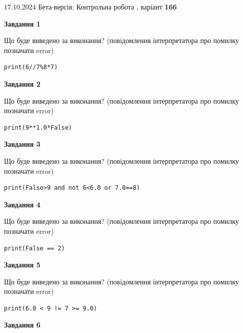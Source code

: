 \documentclass[12pt, ukrainian]{article}
\begin{document}
{\Large{17.10.2024 Бета-версія: Контрольна робота , варіант  \No \textbf { 166 }\par}}
{
\begin {large}
{\begin {center}\textbf{Завдання 1}\end {center}}

Що буде виведено за виконання? (повідомлення інтерпретатора про помилку позначати error)\par
\begin{verbatim}
print(6//7%8*7)
\end{verbatim}

{\begin {center}\textbf{Завдання 2}\end {center}}

Що буде виведено за виконання? (повідомлення інтерпретатора про помилку позначати error)\par
\begin{verbatim}
print(9**1.0*False)
\end{verbatim}

{\begin {center}\textbf{Завдання 3}\end {center}}

Що буде виведено за виконання? (повідомлення інтерпретатора про помилку позначати error)\par
\begin{verbatim}
print(False>9 and not 6<6.0 or 7.0==8)
\end{verbatim}

{\begin {center}\textbf{Завдання 4}\end {center}}

Що буде виведено за виконання? (повідомлення інтерпретатора про помилку позначати error)\par
\begin{verbatim}
print(False == 2)
\end{verbatim}

{\begin {center}\textbf{Завдання 5}\end {center}}

Що буде виведено за виконання? (повідомлення інтерпретатора про помилку позначати error)\par
\begin{verbatim}
print(6.0 < 9 != 7 >= 9.0)
\end{verbatim}

{\begin {center}\textbf{Завдання 6}\end {center}}


\end{large}}
\end{document}
